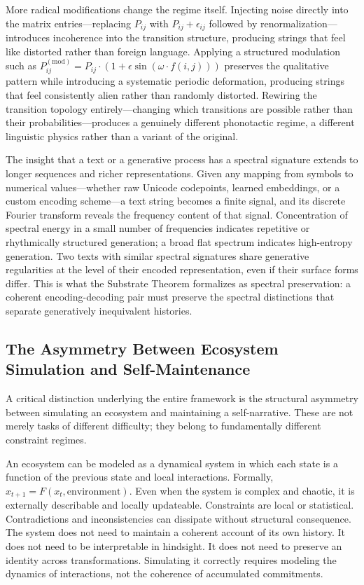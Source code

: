 \documentclass[12pt, a4paper]{article}
\theoremstyle{plain}
\theoremstyle{definition}
\theoremstyle{remark}
\begin{document}
More radical modifications change the regime itself. Injecting noise directly into the matrix entries---replacing $P_{ij}$ with $P_{ij} + \epsilon_{ij}$ followed by renormalization---introduces incoherence into the transition structure, producing strings that feel like distorted rather than foreign language. Applying a structured modulation such as $P_{ij}^{(\mathrm{mod})} = P_{ij} \cdot (1 + \epsilon \sin(\omega \cdot f(i,j)))$ preserves the qualitative pattern while introducing a systematic periodic deformation, producing strings that feel consistently alien rather than randomly distorted. Rewiring the transition topology entirely---changing which transitions are possible rather than their probabilities---produces a genuinely different phonotactic regime, a different linguistic physics rather than a variant of the original.

The insight that a text or a generative process has a spectral signature extends to longer sequences and richer representations. Given any mapping from symbols to numerical values---whether raw Unicode codepoints, learned embeddings, or a custom encoding scheme---a text string becomes a finite signal, and its discrete Fourier transform reveals the frequency content of that signal. Concentration of spectral energy in a small number of frequencies indicates repetitive or rhythmically structured generation; a broad flat spectrum indicates high-entropy generation. Two texts with similar spectral signatures share generative regularities at the level of their encoded representation, even if their surface forms differ. This is what the Substrate Theorem formalizes as spectral preservation: a coherent encoding-decoding pair must preserve the spectral distinctions that separate generatively inequivalent histories.

\subsection{The Asymmetry Between Ecosystem Simulation and Self-Maintenance}

A critical distinction underlying the entire framework is the structural asymmetry between simulating an ecosystem and maintaining a self-narrative. These are not merely tasks of different difficulty; they belong to fundamentally different constraint regimes.

An ecosystem can be modeled as a dynamical system in which each state is a function of the previous state and local interactions. Formally, $x_{t+1} = F(x_t, \text{environment})$. Even when the system is complex and chaotic, it is externally describable and locally updateable. Constraints are local or statistical. Contradictions and inconsistencies can dissipate without structural consequence. The system does not need to maintain a coherent account of its own history. It does not need to be interpretable in hindsight. It does not need to preserve an identity across transformations. Simulating it correctly requires modeling the dynamics of interactions, not the coherence of accumulated commitments.
\end{document}
